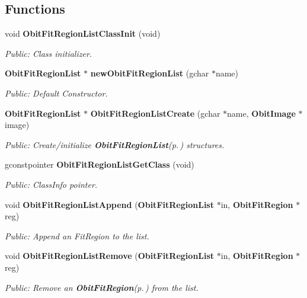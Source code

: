 \subsection*{Functions}
\begin{CompactItemize}
\item 
void {\bf Obit\-Fit\-Region\-List\-Class\-Init} (void)
\begin{CompactList}\small\item\em Public: Class initializer. \item\end{CompactList}\item 
{\bf Obit\-Fit\-Region\-List} $\ast$ {\bf new\-Obit\-Fit\-Region\-List} (gchar $\ast$name)
\begin{CompactList}\small\item\em Public: Default Constructor. \item\end{CompactList}\item 
{\bf Obit\-Fit\-Region\-List} $\ast$ {\bf Obit\-Fit\-Region\-List\-Create} (gchar $\ast$name, {\bf Obit\-Image} $\ast$image)
\begin{CompactList}\small\item\em Public: Create/initialize {\bf Obit\-Fit\-Region\-List}{\rm (p.\,\pageref{structObitFitRegionList})} structures. \item\end{CompactList}\item 
gconstpointer {\bf Obit\-Fit\-Region\-List\-Get\-Class} (void)
\begin{CompactList}\small\item\em Public: Class\-Info pointer. \item\end{CompactList}\item 
void {\bf Obit\-Fit\-Region\-List\-Append} ({\bf Obit\-Fit\-Region\-List} $\ast$in, {\bf Obit\-Fit\-Region} $\ast$reg)
\begin{CompactList}\small\item\em Public: Append an Fit\-Region to the list. \item\end{CompactList}\item 
void {\bf Obit\-Fit\-Region\-List\-Remove} ({\bf Obit\-Fit\-Region\-List} $\ast$in, {\bf Obit\-Fit\-Region} $\ast$reg)
\begin{CompactList}\small\item\em Public: Remove an {\bf Obit\-Fit\-Region}{\rm (p.\,\pageref{structObitFitRegion})} from the list. \item\end{CompactList}\item 

\end{CompactItemize}
